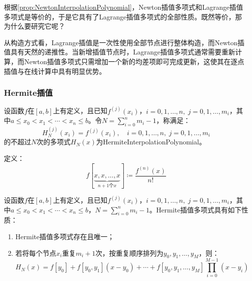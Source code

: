 \begin{note}
	根据\cref{prop:NewtonInterpolationPolynomial}，Newton插值多项式和Lagrange插值多项式是等价的，于是它具有了Lagrange插值多项式的全部性质。既然等价，那为什么要研究它呢？\par
	从构造方式看，Lagrange插值是一次性使用全部节点进行整体构造，而Newton插值具有天然的递推性。当新增插值节点时，Lagrange插值多项式通常需要重新计算，而Newton插值多项式只需增加一个新的均差项即可完成更新，这使其在逐点插值与在线计算中具有明显优势。
\end{note}
\subsubsection{Hermite插值}
\begin{definition}
	设函数$f$在$[a,b]$上有定义，且已知$f^{(j)}(x_i)$，$i=0,1,\dots,n,\;j=0,1,\dots,m_i$，其中$a\leqslant x_0<x_1<\cdots<x_n\leqslant b$。令$N=\sum\limits_{i=0}^{n}m_i-1$，称满足：
	\begin{equation*}
		H^{(j)}_N(x_i)=f^{(j)}(x_i),\quad i=0,1,\dots,n,\;j=0,1,\dots,m_i
	\end{equation*}
	的不超过$N$次的多项式$H_N(x)$为\gls{HermiteInterpolationPolynomial}。
\end{definition}
\begin{definition}
	定义：
	\begin{equation*}
		f[\underbrace{x,x,\dots,x}_{n+1\text{个}x}]\coloneq\frac{f^{(n)}(x)}{n!}
	\end{equation*}
\end{definition}
\begin{property}\label{prop:HermiteInterpolationPolynomial}
	设函数$f$在$[a,b]$上有定义，且已知$f^{(j)}(x_i)$，$i=0,1,\dots,n,\;j=0,1,\dots,m_i$，其中$a\leqslant x_0<x_1<\cdots<x_n\leqslant b$，$N=\sum\limits_{i=0}^{n}m_i-1$。Hermite插值多项式具有如下性质：
	\begin{enumerate}
		\item Hermite插值多项式存在且唯一；
		\item 若将每个节点$x_i$重复$m_i+1$次，按重复顺序排列为$y_0,y_1,\dots,y_M$，则：
		\begin{equation*}
			H_N(x)=f[y_0]+f[y_0,y_1](x-y_0)+\cdots+f[y_0,y_1,\dots,y_M]\prod_{i=0}^{M-1}(x-y_i)
		\end{equation*}
	\end{enumerate}
\end{property}
